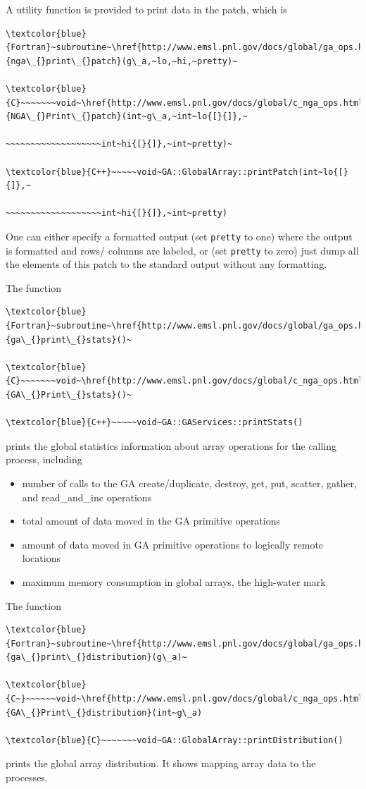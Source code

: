 A utility function is provided to print data in the patch, which is
\begin{verbatim}
\textcolor{blue}{Fortran}~subroutine~\href{http://www.emsl.pnl.gov/docs/global/ga_ops.html\#ga_print_patch}{nga\_{}print\_{}patch}(g\_a,~lo,~hi,~pretty)~

\textcolor{blue}{C}~~~~~~~void~\href{http://www.emsl.pnl.gov/docs/global/c_nga_ops.html\#ga_print_patch}{NGA\_{}Print\_{}patch}(int~g\_a,~int~lo{[}{]},~

~~~~~~~~~~~~~~~~~~~int~hi{[}{]},~int~pretty)~

\textcolor{blue}{C++}~~~~~void~GA::GlobalArray::printPatch(int~lo{[}{]},~

~~~~~~~~~~~~~~~~~~~int~hi{[}{]},~int~pretty)
\end{verbatim}
One can either specify a formatted output (set \texttt{pretty} to
one) where the output is formatted and rows/ columns are labeled,
or (set \texttt{pretty} to zero) just dump all the elements of this
patch to the standard output without any formatting.

The function
\begin{verbatim}
\textcolor{blue}{Fortran}~subroutine~\href{http://www.emsl.pnl.gov/docs/global/ga_ops.html\#ga_print_stats}{ga\_{}print\_{}stats}()~

\textcolor{blue}{C}~~~~~~~void~\href{http://www.emsl.pnl.gov/docs/global/c_nga_ops.html\#ga_print_stats}{GA\_{}Print\_{}stats}()~

\textcolor{blue}{C++}~~~~~void~GA::GAServices::printStats()
\end{verbatim}
prints the global statistics information about array operations for
the calling process, including
\begin{itemize}
\item number of calls to the GA create/duplicate, destroy, get, put, scatter,
gather, and read\_and\_inc operations 
\item total amount of data moved in the GA primitive operations 
\item amount of data moved in GA primitive operations to logically remote
locations 
\item maximum memory consumption in global arrays, the \textquotedbl{}high-water
mark\textquotedbl{}
\end{itemize}
The function
\begin{verbatim}
\textcolor{blue}{Fortran}~subroutine~\href{http://www.emsl.pnl.gov/docs/global/ga_ops.html\#ga_print_distribution}{ga\_{}print\_{}distribution}(g\_a)~

\textcolor{blue}{C~}~~~~~~void~\href{http://www.emsl.pnl.gov/docs/global/c_nga_ops.html\#ga_print_distribution}{GA\_{}Print\_{}distribution}(int~g\_a)

\textcolor{blue}{C}~~~~~~~void~GA::GlobalArray::printDistribution()
\end{verbatim}
prints the global array distribution. It shows mapping array data
to the processes.

